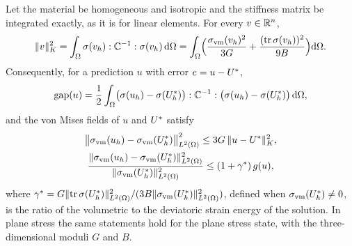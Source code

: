 \begin{proposition}\label{prop:stress}
Let the material be homogeneous and isotropic and the stiffness matrix be integrated
exactly, as it is for linear elements. For every $v\in\mathbb{R}^{n}$,
\begin{equation}
\lVert v\rVert_K^{2} = \int_{\Omega}\sigma(v_h):\mathbb{C}^{-1}:\sigma(v_h)\,\mathrm{d}\Omega
= \int_{\Omega}\Bigl(\frac{\sigma_{\mathrm{vm}}(v_h)^{2}}{3G}
+\frac{(\operatorname{tr}\sigma(v_h))^{2}}{9B}\Bigr)\mathrm{d}\Omega .
\label{eq:stressnorm}
\end{equation}
Consequently, for a prediction $u$ with error $e=u-U^{\ast}$,
\begin{equation}
\operatorname{gap}(u) = \frac12\int_{\Omega}\bigl(\sigma(u_h)-\sigma(U^{\ast}_h)\bigr):\mathbb{C}^{-1}:
\bigl(\sigma(u_h)-\sigma(U^{\ast}_h)\bigr)\,\mathrm{d}\Omega ,
\label{eq:gapstress}
\end{equation}
and the von Mises fields of $u$ and $U^{\ast}$ satisfy
\begin{gather}
\bigl\lVert\sigma_{\mathrm{vm}}(u_h)-\sigma_{\mathrm{vm}}(U^{\ast}_h)\bigr\rVert_{L^2(\Omega)}^{2}\le 3G\,\lVert u-U^{\ast}\rVert_K^{2},
\label{eq:vmbound}\\
\frac{\lVert\sigma_{\mathrm{vm}}(u_h)-\sigma_{\mathrm{vm}}(U^{\ast}_h)\rVert_{L^2(\Omega)}^{2}}{\lVert\sigma_{\mathrm{vm}}(U^{\ast}_h)\rVert_{L^2(\Omega)}^{2}}
\le (1+\gamma^{\ast})\,g(u),
\label{eq:vmboundrel}
\end{gather}
where $\gamma^{\ast}=G\lVert \operatorname{tr}\sigma(U^{\ast}_h)\rVert_{L^2(\Omega)}^2/
(3B\lVert\sigma_{\mathrm{vm}}(U^{\ast}_h)\rVert_{L^2(\Omega)}^2)$, defined when $\sigma_{\mathrm{vm}}(U^{\ast}_h)\neq0$, is the
ratio of the volumetric to the deviatoric strain energy of the solution. In plane stress
the same statements hold for the plane stress state, with the three-dimensional moduli $G$
and $B$.
\end{proposition}

